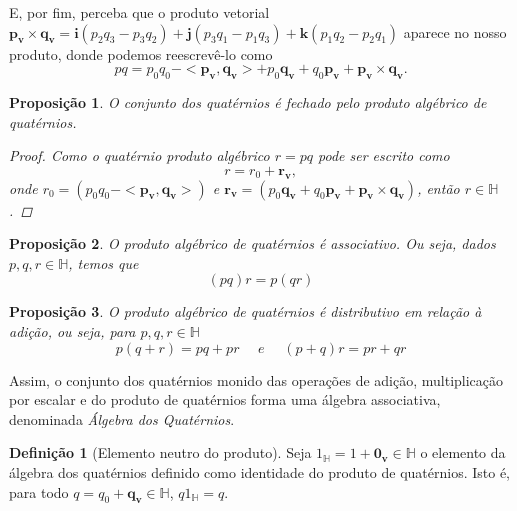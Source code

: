 \documentclass[a4paper,12pt]{report}
\theoremstyle{plain}
\newtheorem{proposicao}{Proposição}[section]
\theoremstyle{definition}
\newtheorem{definicao}{Definição}[section]
\begin{document}
	E, por fim, perceba que o produto vetorial $\mathbf{p_v} \times \mathbf{q_v} = \mathbf{i}(p_2q_3 - p_3q_2) + \mathbf{j}(p_3q_1 - p_1q_3) + \mathbf{k}(p_1q_2 - p_2q_1)$ aparece no nosso produto, donde podemos reescrevê-lo como
	\begin{equation*}
		pq=p_0q_0-<\mathbf{p_v,q_v}>+p_0\mathbf{q_v}+q_0\mathbf{p_v}+\mathbf{p_v}\times\mathbf{q_v}.
	\end{equation*}
	
	\begin{proposicao}
	    O conjunto dos quatérnios é fechado pelo produto algébrico de quatérnios.
		\begin{proof}
			Como o quatérnio produto algébrico $r=pq$ pode ser escrito como 
			\begin{equation}
				r=r_0+\mathbf{r_v},
			\end{equation}
			onde $r_0=(p_0q_0-<\mathbf{p_v,q_v}>)$ e $\mathbf{r_v}=(p_0\mathbf{q_v}+q_0\mathbf{p_v}+\mathbf{p_v}\times\mathbf{q_v})$, então $r \in \mathbb{H}$.
		\end{proof}
	\end{proposicao}
	
	\begin{proposicao}
		O produto algébrico de quatérnios é associativo. Ou seja, dados $p,q,r \in \mathbb{H}$, temos que 
		\begin{equation*}
			(pq)r=p(qr)
		\end{equation*}
	\end{proposicao}
	
	\begin{proposicao}
		O produto algébrico de quatérnios é distributivo em relação à adição, ou seja, para $p,q,r \in \mathbb{H}$
		\begin{equation*}
			p(q+r)=pq+pr \,\,\,\,\,\,\,\,e\,\,\,\,\,\,\,\, (p+q)r=pr+qr
		\end{equation*}	
	\end{proposicao}
	
	Assim, o conjunto dos quatérnios monido das operações de adição, multiplicação por escalar e do produto de quatérnios forma uma álgebra associativa, denominada \textit{Álgebra dos Quatérnios}.

	\begin{definicao}[Elemento neutro do produto]
		Seja $1_\mathbb{H} = 1 + \mathbf{0_v} \in \mathbb{H}$ o elemento da álgebra dos quatérnios definido como identidade do produto de quatérnios. Isto é, para todo $q = q_0 + \mathbf{q_v} \in \mathbb{H}$, $q1_\mathbb{H} = q$.
	\end{definicao}
	
\end{document}
